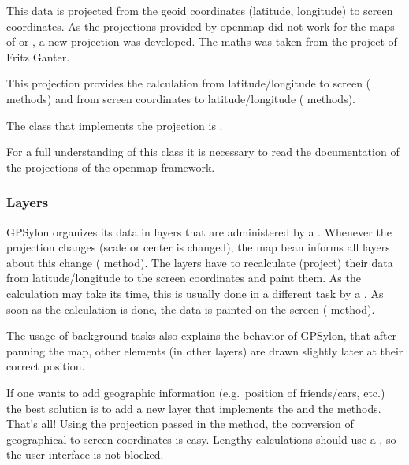 \documentclass[a4paper]{article} %
\begin{document}
This data is projected from the geoid coordinates (latitude,
longitude) to screen coordinates. As the projections provided by
openmap did not work for the maps of
 or
, a new projection was
developed. The maths was taken from the
 project of Fritz
Ganter.

This projection provides the calculation from latitude/longitude to
screen ( methods) and from screen coordinates to
latitude/longitude ( methods).

The class that implements the projection is
. 

For a full understanding of this class it is necessary to read the
documentation of the projections of the openmap framework.

\subsubsection{Layers}
\label{SoftwareDesignOfTheGpstoolPackage-Layers}

GPSylon organizes its data in layers that are administered by a
. Whenever the projection changes
(scale or center is changed), the map bean informs all layers about
this change ( method). The layers have
to recalculate (project) their data from latitude/longitude to the
screen coordinates and paint them. As the calculation may take its
time, this is usually done in a different task by a
. As soon as the calculation is done, the data
is painted on the screen ( method).

The usage of background tasks also explains the behavior of GPSylon,
that after panning the map, other elements (in other layers) are drawn
slightly later at their correct position.

If one wants to add geographic information (e.g.~position of
friends/cars, etc.) the best solution is to add a new layer that
implements the  and the
 methods. That's all! Using the projection
passed in the  method, the conversion of
geographical to screen coordinates is easy. Lengthy calculations
should use a , so the user interface is not
blocked. 
\end{document}

